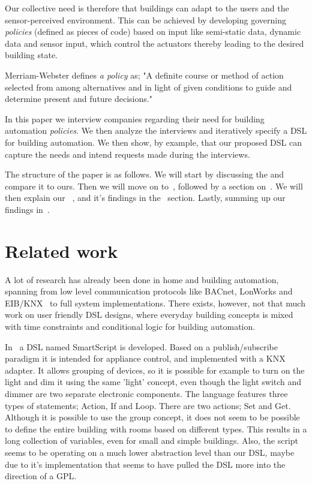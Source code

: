 \documentclass{llncs}
\begin{document}
Our collective need is therefore that buildings can adapt to the users and the sensor-perceived environment. This can be achieved by developing governing \textit{policies} (defined as pieces of code) based on input like semi-static data, dynamic data and sensor input, which control the actuators thereby leading to the desired building state.

Merriam-Webster defines \textit{a policy} as; "A definite course or method of action selected from among alternatives and in light of given conditions to guide and determine present and future decisions."

In this paper we interview companies regarding their need for building automation \textit{policies}. We then analyze the interviews and iteratively specify a DSL for building automation. We then show, by example, that our proposed DSL can capture the needs and intend requests made during the interviews.

The structure of the paper is as follows. We will start by discussing the and compare it to ours. Then we will move on to~, followed by a section on~. We will then explain our~ , and it's findings in the~ section. Lastly, summing up our findings in~.

\section{Related work}\label{sec:relatedwork}
A lot of research has already been done in home and building automation, spanning from low level communication protocols like BACnet, LonWorks and EIB/KNX~\cite{communication} to full system implementations. There exists, however, not that much work on user friendly DSL designs, where everyday building concepts is mixed with time constraints and conditional logic for building automation. 

In~\cite{smartscript} a DSL named SmartScript is developed. Based on a publish/subscribe paradigm it is intended for appliance control, and implemented with a KNX adapter. It allows grouping of devices, so it is possible for example to turn on the light and dim it using the same 'light' concept, even though the light switch and dimmer are two separate electronic components. The language features three types of statements; Action, If and Loop. There are two actions; Set and Get. Although it is possible to use the group concept, it does not seem to be possible to define the entire building with rooms based on different types. This results in a long collection of variables, even for small and simple buildings. Also, the script seems to be operating on a much lower abstraction level than our DSL, maybe due to it's implementation that seems to have pulled the DSL more into the direction of a GPL. 
\end{document}
